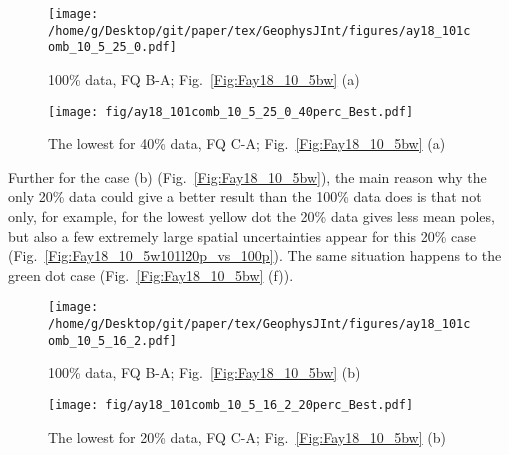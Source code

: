 \begin{figure*}[tbp]
  \captionsetup[subfigure]{labelformat=empty,aboveskip=-6pt,belowskip=-6pt}
  \centering
  \begin{subfigure}[htbp]{.49\textwidth}
    \captionsetup{skip=0pt}  %
    \centering
    \texttt{[image: /home/g/Desktop/git/paper/tex/GeophysJInt/figures/ay18\_101comb\_10\_5\_25\_0.pdf]}
	\caption{100\% data, FQ B-A; Fig.~\ref{Fig:Fay18_10_5bw}
	(a)}\label{Fig:Fay18_10_5b101}
  \end{subfigure}
  \begin{subfigure}[htbp]{.49\textwidth}
    \captionsetup{skip=0pt}
    \centering
    \texttt{[image: fig/ay18\_101comb\_10\_5\_25\_0\_40perc\_Best.pdf]}
    \caption{The lowest for 40\% data, FQ C-A;
	Fig.~\ref{Fig:Fay18_10_5bw} (a)}\label{Fig:Fay18_10_5b101l40p}
  \end{subfigure}
  \caption[Less data, better similarity?]{Comparing the 100\% North American
  120 Ma paleomagnetic data derived result with the best of the only
  40\% data (giving even better similarity) derived results (the lowest yellow
  dot in Fig.~\ref{Fig:Fay18_10_5bw} (a)).}\label{Fig:Fay18_10_5b101l40p_vs_100p}
\end{figure*}

Further for the case (b) (Fig.~\ref{Fig:Fay18_10_5bw}), the main reason why the
only 20\% data could give a better result than the 100\% data does is that not
only, for example, for the lowest yellow dot the 20\% data gives less mean
poles, but also a few extremely large spatial uncertainties appear for this
20\% case (Fig.~\ref{Fig:Fay18_10_5w101l20p_vs_100p}). The same situation
happens to the green dot case (Fig.~\ref{Fig:Fay18_10_5bw} (f)).

\begin{figure*}[tbp]
  \captionsetup[subfigure]{labelformat=empty,aboveskip=-6pt,belowskip=-6pt}
  \centering
  \begin{subfigure}[htbp]{.49\textwidth}
    \captionsetup{skip=0pt}
    \centering
    \texttt{[image: /home/g/Desktop/git/paper/tex/GeophysJInt/figures/ay18\_101comb\_10\_5\_16\_2.pdf]}
	\caption{100\% data, FQ B-A; Fig.~\ref{Fig:Fay18_10_5bw}
	(b)}\label{Fig:Fay18_10_5w101}
  \end{subfigure}
  \begin{subfigure}[htbp]{.49\textwidth}
    \captionsetup{skip=0pt}
    \centering
    \texttt{[image: fig/ay18\_101comb\_10\_5\_16\_2\_20perc\_Best.pdf]}  %
    \caption{The lowest for 20\% data, FQ C-A;
	Fig.~\ref{Fig:Fay18_10_5bw} (b)}\label{Fig:Fay18_10_5w101l20p}
  \end{subfigure}
  \caption[Less data, better similarity?]{Comparing the 100\% North American
  120 Ma paleomagnetic data derived result with the best of the only
  20\% data (giving even better similarity) derived results (the yellow dot in
  Fig.~\ref{Fig:Fay18_10_5bw} (b)).}\label{Fig:Fay18_10_5w101l20p_vs_100p}
\end{figure*}

